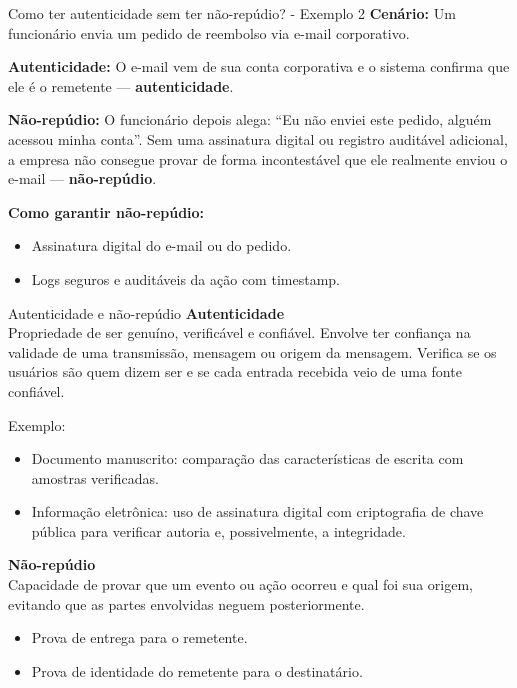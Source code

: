 \begin{frame}{Como ter autenticidade sem ter não-repúdio? - Exemplo 2}
    \textbf{Cenário:} Um funcionário envia um pedido de reembolso via e-mail corporativo.

    \medskip
    \textbf{Autenticidade:}
    O e-mail vem de sua conta corporativa e o sistema confirma que ele é o remetente — \textbf{autenticidade}.

    \medskip
    \textbf{Não-repúdio:}
    O funcionário depois alega: ``Eu não enviei este pedido, alguém acessou minha conta''.
    Sem uma assinatura digital ou registro auditável adicional, a empresa não consegue provar de forma incontestável que ele realmente enviou o e-mail — \textbf{não-repúdio}.

    \medskip
    \textbf{Como garantir não-repúdio:}
    \begin{itemize}
        \item Assinatura digital do e-mail ou do pedido.
        \item Logs seguros e auditáveis da ação com timestamp.
    \end{itemize}
\end{frame}


\begin{frame}{Autenticidade e não-repúdio}
    \textbf{Autenticidade} \\
    Propriedade de ser genuíno, verificável e confiável. Envolve ter confiança na validade de uma transmissão, mensagem ou origem da mensagem.
    Verifica se os usuários são quem dizem ser e se cada entrada recebida veio de uma fonte confiável.

    \medskip
    Exemplo:
    \begin{itemize}
        \item Documento manuscrito: comparação das características de escrita com amostras verificadas.
        \item Informação eletrônica: uso de assinatura digital com criptografia de chave pública para verificar autoria e, possivelmente, a integridade.
    \end{itemize}

    \medskip
    \textbf{Não-repúdio} \\
    Capacidade de provar que um evento ou ação ocorreu e qual foi sua origem, evitando que as partes envolvidas neguem posteriormente.
    \begin{itemize}
        \item Prova de entrega para o remetente.
        \item Prova de identidade do remetente para o destinatário.
    \end{itemize}
\end{frame}

